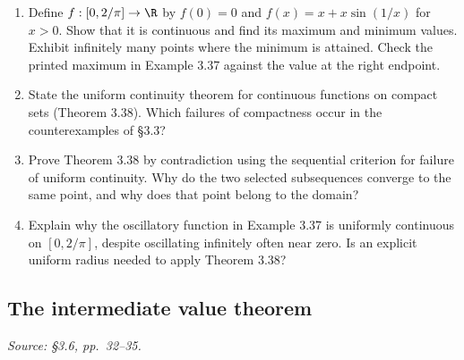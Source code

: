 \begin{enumerate}[resume]
  \item Define \(f:[0,2/\pi]\to\R\) by \(f(0)=0\) and
    \(f(x)=x+x\sin(1/x)\) for \(x>0\).
    Show that it is continuous and find its maximum and minimum values.
    Exhibit infinitely many points where the minimum is attained.
    Check the printed maximum in Example 3.37 against the value at
    the right endpoint.

  \item State the uniform continuity theorem for continuous functions
    on compact sets (Theorem 3.38). Which failures of compactness
    occur in the counterexamples of \S3.3?

  \item Prove Theorem 3.38 by contradiction using the sequential
    criterion for failure of uniform continuity. Why do the two
    selected subsequences converge to the same point, and why does
    that point belong to the domain?

  \item Explain why the oscillatory function in Example 3.37 is
    uniformly continuous on \([0,2/\pi]\), despite oscillating
    infinitely often near zero. Is an explicit uniform radius needed
    to apply Theorem 3.38?
\end{enumerate}

\subsection{The intermediate value theorem}
\textit{Source: \S3.6, pp.~32--35.}

